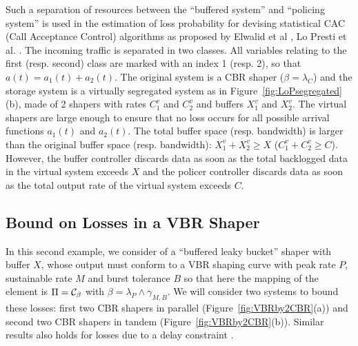 Such a separation of resources between the ``buffered system'' and
``policing system'' is used in the estimation of loss probability
for devising statistical CAC (Call Acceptance Control) algorithms as
proposed by Elwalid et al \cite{Elwalid}, Lo Presti
et al. \cite{LOP98}.
The incoming traffic is separated in two classes.
All variables relating to the first (resp. second) class are marked
with an index 1 (resp. 2),
so that $a(t) = a_1(t) + a_2(t)$.
The original system is a CBR shaper ($\beta = \lambda_C$) and the storage system
is a virtually segregated system as in Figure~\ref{fig:LoPsegregated}(b),
made of 2 shapers with rates $C_1^v$ and $C_2^v$ and buffers $X_1^v$ and $X_2^v$.
The virtual shapers are large enough to ensure that no loss occurs
for all possible arrival functions $a_1(t)$ and $a_2(t)$.
 The total buffer space (resp. bandwidth) is larger
 than the original buffer space (resp. bandwidth):
 $X_1^v + X_2^v \geq X$ ($C_1^v + C_2^v \geq C$).
However, the buffer controller discards data as soon as the total backlogged
data in the virtual system exceeds $X$ and the policer controller
discards data as soon as the total output rate of the virtual system exceeds $C$.



\subsection{Bound on Losses in a VBR Shaper}

In this second example, we consider  of a ``buffered leaky bucket'' shaper \cite{leb96}
with buffer $X$, whose output must conform to a VBR shaping curve
with peak rate $P$, sustainable rate $M$ and burst tolerance $B$ so
that here the mapping of the element is $\Pi = \mathcal C_{\beta}$ with
$\beta = \lambda_P \wedge \gamma_{M,B}$.
We will consider two systems to bound these losses: first two CBR
shapers
in parallel (Figure~\ref{fig:VBRby2CBR}(a)) and second two CBR shapers
in tandem (Figure~\ref{fig:VBRby2CBR}(b)). Similar results also holds for losses due to a delay constraint \cite{TimeSpac}.


